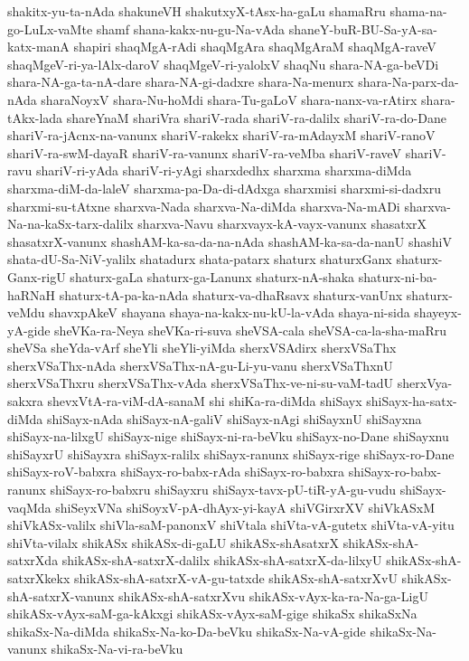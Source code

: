 {shakitx-yu-ta-nAda
shakuneVH
shakutxyX-tAsx-ha-gaLu
shamaRru
shama-na-go-LuLx-vaMte
shamf
shana-kakx-nu-gu-Na-vAda
shaneY-buR-BU-Sa-yA-sa-katx-manA
shapiri
shaqMgA-rAdi
shaqMgAra
shaqMgAraM
shaqMgA-raveV
shaqMgeV-ri-ya-lAlx-daroV
shaqMgeV-ri-yalolxV
shaqNu
shara-NA-ga-beVDi
shara-NA-ga-ta-nA-dare
shara-NA-gi-dadxre
shara-Na-menurx
shara-Na-parx-da-nAda
sharaNoyxV
shara-Nu-hoMdi
shara-Tu-gaLoV
shara-nanx-va-rAtirx
shara-tAkx-lada
shareYnaM
shariVra
shariV-rada
shariV-ra-dalilx
shariV-ra-do-Dane
shariV-ra-jAcnx-na-vanunx
shariV-rakekx
shariV-ra-mAdayxM
shariV-ranoV
shariV-ra-swM-dayaR
shariV-ra-vanunx
shariV-ra-veMba
shariV-raveV
shariV-ravu
shariV-ri-yAda
shariV-ri-yAgi
sharxdedhx
sharxma
sharxma-diMda
sharxma-diM-da-laleV
sharxma-pa-Da-di-dAdxga
sharxmisi
sharxmi-si-dadxru
sharxmi-su-tAtxne
sharxva-Nada
sharxva-Na-diMda
sharxva-Na-mADi
sharxva-Na-na-kaSx-tarx-dalilx
sharxva-Navu
sharxvayx-kA-vayx-vanunx
shasatxrX
shasatxrX-vanunx
shashAM-ka-sa-da-na-nAda
shashAM-ka-sa-da-nanU
shashiV
shata-dU-Sa-NiV-yalilx
shatadurx
shata-patarx
shaturx
shaturxGanx
shaturx-Ganx-rigU
shaturx-gaLa
shaturx-ga-Lanunx
shaturx-nA-shaka
shaturx-ni-ba-haRNaH
shaturx-tA-pa-ka-nAda
shaturx-va-dhaRsavx
shaturx-vanUnx
shaturx-veMdu
shavxpAkeV
shayana
shaya-na-kakx-nu-kU-la-vAda
shaya-ni-sida
shayeyx-yA-gide
sheVKa-ra-Neya
sheVKa-ri-suva
sheVSA-cala
sheVSA-ca-la-sha-maRru
sheVSa
sheYda-vArf
sheYli
sheYli-yiMda
sherxVSAdirx
sherxVSaThx
sherxVSaThx-nAda
sherxVSaThx-nA-gu-Li-yu-vanu
sherxVSaThxnU
sherxVSaThxru
sherxVSaThx-vAda
sherxVSaThx-ve-ni-su-vaM-tadU
sherxVya-sakxra
shevxVtA-ra-viM-dA-sanaM
shi
shiKa-ra-diMda
shiSayx
shiSayx-ha-satx-diMda
shiSayx-nAda
shiSayx-nA-galiV
shiSayx-nAgi
shiSayxnU
shiSayxna
shiSayx-na-lilxgU
shiSayx-nige
shiSayx-ni-ra-beVku
shiSayx-no-Dane
shiSayxnu
shiSayxrU
shiSayxra
shiSayx-ralilx
shiSayx-ranunx
shiSayx-rige
shiSayx-ro-Dane
shiSayx-roV-babxra
shiSayx-ro-babx-rAda
shiSayx-ro-babxra
shiSayx-ro-babx-ranunx
shiSayx-ro-babxru
shiSayxru
shiSayx-tavx-pU-tiR-yA-gu-vudu
shiSayx-vaqMda
shiSeyxVNa
shiSoyxV-pA-dhAyx-yi-kayA
shiVGirxrXV
shiVkASxM
shiVkASx-valilx
shiVla-saM-panonxV
shiVtala
shiVta-vA-gutetx
shiVta-vA-yitu
shiVta-vilalx
shikASx
shikASx-di-gaLU
shikASx-shAsatxrX
shikASx-shA-satxrXda
shikASx-shA-satxrX-dalilx
shikASx-shA-satxrX-da-lilxyU
shikASx-shA-satxrXkekx
shikASx-shA-satxrX-vA-gu-tatxde
shikASx-shA-satxrXvU
shikASx-shA-satxrX-vanunx
shikASx-shA-satxrXvu
shikASx-vAyx-ka-ra-Na-ga-LigU
shikASx-vAyx-saM-ga-kAkxgi
shikASx-vAyx-saM-gige
shikaSx
shikaSxNa
shikaSx-Na-diMda
shikaSx-Na-ko-Da-beVku
shikaSx-Na-vA-gide
shikaSx-Na-vanunx
shikaSx-Na-vi-ra-beVku
}
